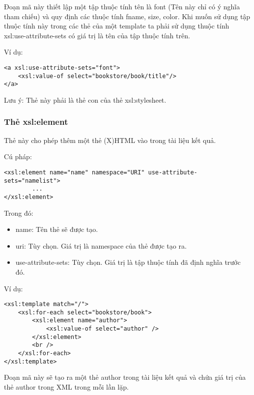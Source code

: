 Đoạn mã này thiết lập một tập thuộc tính tên là {\ttfamily font} (Tên này chỉ có ý nghĩa tham chiếu) và quy định các thuộc tính {\ttfamily fname, size, color}. Khi muốn sử dụng tập thuộc tính này trong các thẻ của một template ta phải sử dụng thuộc tính {\ttfamily xsl:use-attribute-sets} có giá trị là tên của tập thuộc tính trên.

Ví dụ:
\lstset{language=XML}
\begin{lstlisting}[escapechar=`]
<a xsl:use-attribute-sets="font">
	<xsl:value-of select="bookstore/book/title"/>
</a>
\end{lstlisting}

Lưu ý: Thẻ này phải là thẻ con của thẻ {\ttfamily xsl:stylesheet}.
\subsubsection {Thẻ xsl:element}
Thẻ này cho phép thêm một thẻ (X)HTML vào trong tài liệu kết quả. 

Cú pháp:
\lstset{language=XML}
\begin{lstlisting}[escapechar=`]
<xsl:element name="name" namespace="URI" use-attribute-sets="namelist">
		...
</xsl:element>
\end{lstlisting}

Trong đó:
\begin{itemize}

\item {\ttfamily name}: Tên thẻ sẽ được tạo.
\item {\ttfamily uri}: Tùy chọn. Giá trị là namespace của thẻ được tạo ra.

\item {\ttfamily use-attribute-sets}: Tùy chọn. Giá trị là tập thuộc tính đã định nghĩa trước đó.
\end{itemize}

Ví dụ:
\lstset{language=XML}
\begin{lstlisting}[escapechar=`]
<xsl:template match="/">
	<xsl:for-each select="bookstore/book">
		<xsl:element name="author">
			<xsl:value-of select="author" />
		</xsl:element>
		<br />
	</xsl:for-each>
</xsl:template>
\end{lstlisting}

Đoạn mã này sẽ tạo ra một thẻ {\ttfamily author} trong tài liệu kết quả và chứa giá trị của thẻ {\ttfamily author} trong XML trong mỗi lần lặp.
